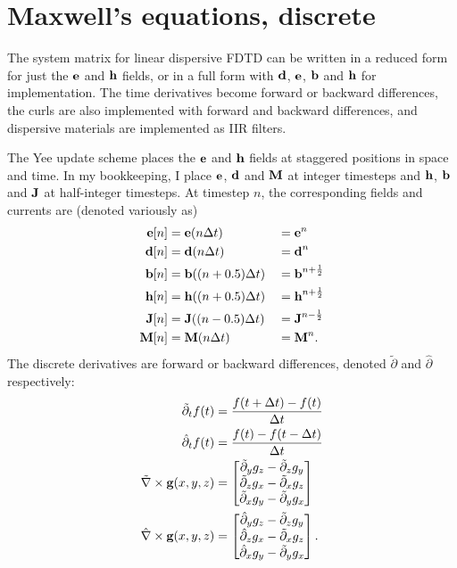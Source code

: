 \section{Maxwell's equations, discrete}

The system matrix for linear dispersive FDTD can be written in a reduced form for just the $\textbf{e}$ and $\textbf{h}$ fields, or in a full form with $\textbf{d}$, $\textbf{e}$, $\textbf{b}$ and $\textbf{h}$ for implementation.  The time derivatives become forward or backward differences, the curls are also implemented with forward and backward differences, and dispersive materials are implemented as IIR filters.

The Yee update scheme places the $\textbf{e}$ and $\textbf{h}$ fields at staggered positions in space and time.  In my bookkeeping, I place $\textbf{e}$, $\textbf{d}$ and $\textbf{M}$ at integer timesteps and $\textbf{h}$, $\textbf{b}$ and $\textbf{J}$ at half-integer timesteps.  At timestep $n$, the corresponding fields and currents are (denoted variously as)
%
\begin{equation}
\begin{aligned}
    \textbf{e}[n] &= \textbf{e}(n \Delta t) &&= \textbf{e}^n \\
    \textbf{d}[n] &= \textbf{d}(n \Delta t) &&= \textbf{d}^n \\
    \textbf{b}[n] &= \textbf{b}( (n+ 0.5)\Delta t) &&= \textbf{b}^{n+\frac{1}{2}} \\
    \textbf{h}[n] &= \textbf{h}( (n+0.5)\Delta t) &&= \textbf{h}^{n + \frac{1}{2}} \\
    \textbf{J}[n] &= \textbf{J}( (n-0.5)\Delta t) &&= \textbf{J}^{n - \frac{1}{2}} \\
    \textbf{M}[n] &= \textbf{M}(n \Delta t) &&= \textbf{M}^n.
\end{aligned}
\end{equation}
%
The discrete derivatives are forward or backward differences, denoted $\tilde \partial$ and $\hat \partial$ respectively:
%
\begin{equation}
\begin{aligned}
	\tilde \partial_t f(t) &= \frac{f(t+\Delta t) - f(t)}{\Delta t} \\
	\hat \partial_t f(t) &= \frac{f(t) - f(t-\Delta t)}{\Delta t} \\
	\tilde \nabla \times \textbf{g}(x,y,z) &= 
		\begin{bmatrix}
			\tilde \partial_y g_z - \tilde \partial_z g_y \\
			\tilde \partial_z g_x - \tilde \partial_x g_z \\
			\tilde \partial_x g_y - \tilde \partial_y g_x \\
		\end{bmatrix} \\
	\hat \nabla \times \textbf{g}(x,y,z) &=
		\begin{bmatrix}
			\hat \partial_y g_z - \tilde \partial_z g_y \\
			\hat \partial_z g_x - \tilde \partial_x g_z \\
			\hat \partial_x g_y - \tilde \partial_y g_x \\
		\end{bmatrix}.
\end{aligned}
\end{equation}
